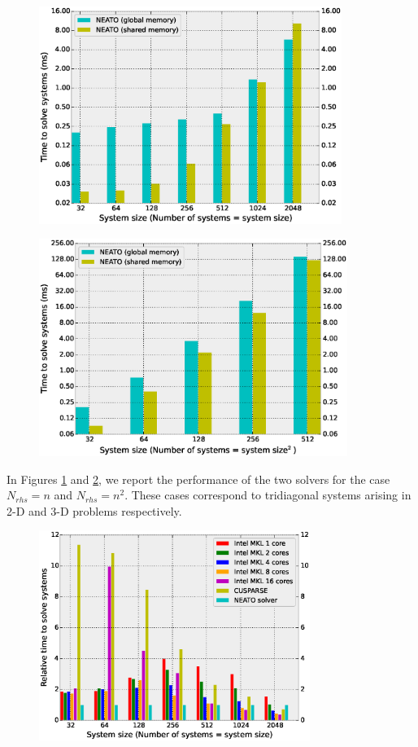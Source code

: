 \documentclass{elsarticle}
\begin{document}
\begin{figure}[h!]
\begin{center}
\includegraphics[height=200pt]{fig/global-vs-shared-2d.eps}
\end{center}
\label{fig:global-vs-shared-2d}
\end{figure}

\begin{figure}[h!]
\begin{center}
\includegraphics[height=200pt]{fig/global-vs-shared-3d.eps}
\end{center}
\label{fig:global-vs-shared-3d}
\end{figure}

In Figures \ref{fig:global-vs-shared-2d} and \ref{fig:global-vs-shared-3d},
we report the performance of the two solvers for the case
$N_{rhs} = n$ and $N_{rhs} = n^2$.
These cases correspond to tridiagonal systems
arising in 2-D and 3-D problems respectively.


\begin{figure}[h!]
\begin{center}
\includegraphics[width=250pt]{fig/bench-2d.eps}
\end{center}
\label{fig:k20-bench-2d}
\end{figure}
\end{document}
